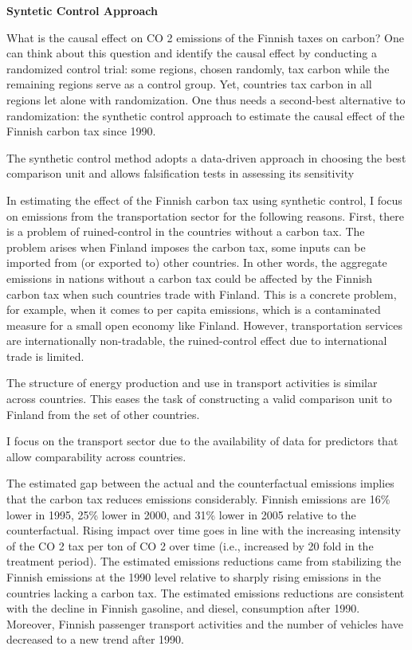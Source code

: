 \documentclass[
]{book}
\begin{document}
\textbf{Syntetic Control Approach}

What is the causal effect on CO 2 emissions of the Finnish taxes on carbon? One can
think about this question and identify the causal effect by conducting a randomized control
trial: some regions, chosen randomly, tax carbon while the remaining regions serve as a
control group. Yet, countries tax carbon in all regions let alone with randomization. One
thus needs a second-best alternative to randomization: the synthetic control approach to
estimate the causal effect of the Finnish carbon tax since 1990.

The synthetic control method adopts a data-driven approach in choosing the best
comparison unit and allows falsification tests in assessing its sensitivity

In estimating the effect of the Finnish carbon tax using synthetic control, I focus
on emissions from the transportation sector for the following reasons. First, there is a
problem of ruined-control in the countries without a carbon tax. The problem arises
when Finland imposes the carbon tax, some inputs can be imported from (or exported
to) other countries. In other words, the aggregate emissions in nations without a carbon
tax could be affected by the Finnish carbon tax when such countries trade with Finland.
This is a concrete problem, for example, when it comes to per capita emissions, which is
a contaminated measure for a small open economy like Finland. However, transportation
services are internationally non-tradable, the ruined-control effect due to international
trade is limited.

The structure of energy production and use in transport activities is
similar across countries. This eases the task of constructing a valid comparison unit to
Finland from the set of other countries.

I focus on the transport sector due to the availability of data for
predictors that allow comparability across countries.

The estimated gap between the actual and the counterfactual emissions implies that
the carbon tax reduces emissions considerably. Finnish emissions are 16\% lower in 1995,
25\% lower in 2000, and 31\% lower in 2005 relative to the counterfactual. Rising impact
over time goes in line with the increasing intensity of the CO 2 tax per ton of CO 2 over
time (i.e., increased by 20 fold in the treatment period). The estimated emissions
reductions came from stabilizing the Finnish emissions at the 1990 level relative to
sharply rising emissions in the countries lacking a carbon tax. The estimated emissions
reductions are consistent with the decline in Finnish gasoline, and diesel, consumption
after 1990. Moreover, Finnish passenger transport activities and the number of vehicles
have decreased to a new trend after 1990.
\end{document}
